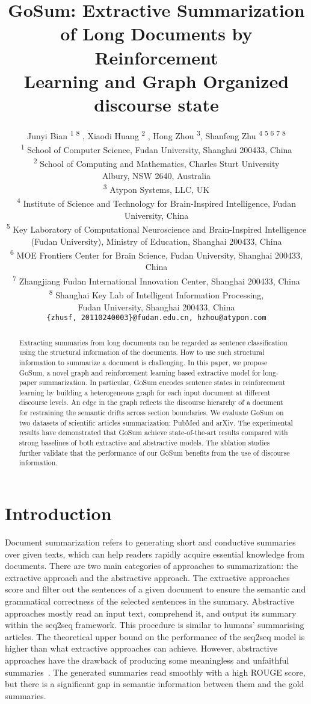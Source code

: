 \documentclass[11pt,a4paper]{article}
\title{GoSum: Extractive Summarization of Long Documents by Reinforcement \\ Learning and Graph Organized discourse state}
\author{Junyi Bian \textsuperscript{\rm 1 \rm 8} , Xiaodi Huang \textsuperscript{\rm 2} , Hong Zhou \textsuperscript{\rm 3}, Shanfeng Zhu \textsuperscript{\rm 4 \rm 5 \rm 6 \rm 7 \rm 8}   \\
  \textsuperscript{\rm 1} School of Computer Science, Fudan University, Shanghai 200433, China\\
  \textsuperscript{\rm 2} School of Computing and Mathematics, Charles Sturt University \\ Albury, NSW 2640, Australia\\
  \textsuperscript{\rm 3} Atypon Systems, LLC, UK\\
  \textsuperscript{\rm 4} Institute of Science and Technology for Brain-Inspired Intelligence, Fudan University, China\\
  \textsuperscript{\rm 5} Key Laboratory of Computational Neuroscience and Brain-Inspired Intelligence \\ (Fudan University), Ministry of Education, Shanghai 200433, China\\
  \textsuperscript{\rm 6} MOE Frontiers Center for Brain Science, Fudan University, Shanghai 200433, China\\
  \textsuperscript{\rm 7} Zhangjiang Fudan International Innovation Center, Shanghai 200433, China\\
  \textsuperscript{\rm 8} Shanghai Key Lab of Intelligent Information Processing, \\ Fudan University, Shanghai 200433, China\\
  \texttt{\{zhusf, 20110240003\}@fudan.edu.cn, hzhou@atypon.com} \\
}
\date{}
\begin{document}
\maketitle

\begin{abstract}
Extracting summaries from long documents can be regarded as sentence classification  using the structural information of the documents.
How to use such structural information to summarize a document is challenging.
In this paper, we propose GoSum, a novel graph and reinforcement learning based extractive model for long-paper summarization.
In particular, GoSum encodes sentence states in reinforcement learning by building a heterogeneous graph for each input document at different discourse levels. An edge in the graph reflects the discourse hierarchy of a document for restraining the semantic drifts across section boundaries.
We evaluate GoSum on two datasets of scientific articles summarization: PubMed and arXiv. 
The experimental results have demonstrated that GoSum achieve state-of-the-art results compared with strong baselines of both extractive and abstractive models.
The ablation studies further validate that the performance of our GoSum benefits from the use of discourse information.


























\end{abstract}
 \section{Introduction}
\label{sec:intro}



Document summarization refers to generating short and conductive summaries over given texts, which can help readers rapidly acquire essential knowledge from documents.
There are two main categories of approaches to summarization: the extractive approach and the abstractive approach.
The extractive approaches score and filter out the sentences of a given document to ensure the semantic and grammatical correctness of the selected sentences in the summary.
Abstractive approaches mostly read an input text, comprehend it, and output its summary within the seq2seq framework.
This procedure is similar to humans'  summarising articles.
The theoretical upper bound on the performance of the seq2seq model is higher than what extractive approaches can achieve.
However, abstractive approaches  have the drawback of producing some meaningless and unfaithful summaries~\cite{fact_2020}. The generated summaries read smoothly with a high ROUGE score, but there is a significant gap in semantic information between them and the gold summaries.
\end{document}
